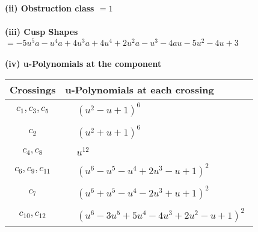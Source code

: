 \documentclass[1p]{elsarticle_modified}
\theoremstyle{definition}
\begin{document}
\flushleft \textbf{(ii) Obstruction class $= 1$}\\~\\
\flushleft \textbf{(iii) Cusp Shapes $= -5 u^5 a- u^4 a+4 u^3 a+4 u^4+2 u^2 a- u^3-4 a u-5 u^2-4 u+3$}\\~\\
\newpage\renewcommand{\arraystretch}{1}
\flushleft \textbf{(iv) u-Polynomials at the component}\newline \\
\begin{tabular}{m{50pt}|m{274pt}}
Crossings & \hspace{64pt}u-Polynomials at each crossing \\
\hline $$\begin{aligned}c_{1},c_{3},c_{5}\end{aligned}$$&$\begin{aligned}
&(u^2- u+1)^6
\end{aligned}$\\
\hline $$\begin{aligned}c_{2}\end{aligned}$$&$\begin{aligned}
&(u^2+u+1)^6
\end{aligned}$\\
\hline $$\begin{aligned}c_{4},c_{8}\end{aligned}$$&$\begin{aligned}
&u^{12}
\end{aligned}$\\
\hline $$\begin{aligned}c_{6},c_{9},c_{11}\end{aligned}$$&$\begin{aligned}
&(u^6- u^5- u^4+2 u^3- u+1)^2
\end{aligned}$\\
\hline $$\begin{aligned}c_{7}\end{aligned}$$&$\begin{aligned}
&(u^6+u^5- u^4-2 u^3+u+1)^2
\end{aligned}$\\
\hline $$\begin{aligned}c_{10},c_{12}\end{aligned}$$&$\begin{aligned}
&(u^6-3 u^5+5 u^4-4 u^3+2 u^2- u+1)^2
\end{aligned}$\\
\hline
\end{tabular}\\~\\
\end{document}
